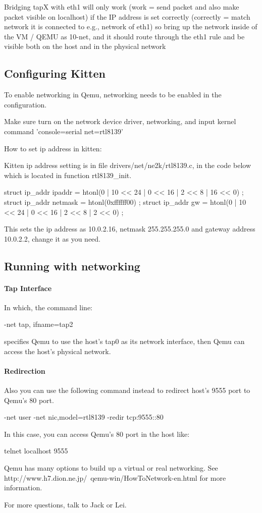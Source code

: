 \documentclass[11pt]{article}
\begin{document}
Bridging tapX with eth1 will only work (work = send packet and also
make packet visible on localhost) if the IP address is set correctly
(correctly = match network it is connected to e.g., network of eth1)
so bring up the network inside of the VM / QEMU as 10-net, and it
should route through the eth1 rule and be visible both on the host and
in the physical network


\subsection{Configuring Kitten}

To enable networking in Qemu, networking needs to be enabled in the configuration.

Make sure turn on the network device driver, networking, and input
kernel command 'console=serial net=rtl8139'

How to set ip address in kitten:

Kitten ip address setting is in file drivers/net/ne2k/rtl8139.c, in the code below which is located in function rtl8139\_init.

  struct ip\_addr ipaddr = { htonl(0 | 10 << 24 | 0 << 16 | 2 << 8 | 16 << 0) }; 
  struct ip\_addr netmask = { htonl(0xffffff00) }; 
  struct ip\_addr gw = { htonl(0 | 10 << 24 | 0 << 16 | 2 << 8 | 2 << 0) };

This sets the ip address as 10.0.2.16, netmask 255.255.255.0 and gateway address 10.0.2.2, change it as you need.



\subsection{Running with networking}

\paragraph*{Tap Interface}
In which, the command line: 

-net tap, ifname=tap2

specifies Qemu to use the host's tap0 as its network interface, then Qemu can access the host's physical network.

\paragraph*{Redirection}

Also you can use the following command instead to redirect host's 9555 port to Qemu's 80 port.

-net user -net nic,model=rtl8139  -redir tcp:9555::80

In this case, you can access Qemu's 80 port in the host like:

telnet localhost 9555

Qemu has many options to build up a virtual or real networking. See http://www.h7.dion.ne.jp/~qemu-win/HowToNetwork-en.html for more information.






For more questions, talk to Jack or Lei.
\end{document}
